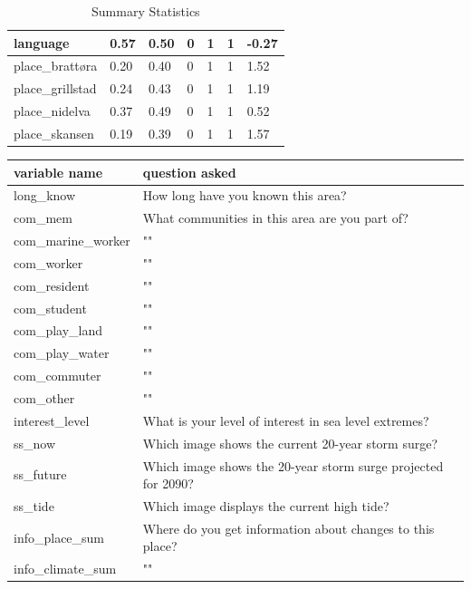 \begin{center}
\begin{table}[h]
\begin{tabular}{|l|l|l|l|l|l|l|}
        language & 0.57 & 0.50 & 0 & 1 & 1 & -0.27  \\ \hline
        place\_brattøra & 0.20 & 0.40 & 0 & 1 & 1 & 1.52  \\ \hline
        place\_grillstad & 0.24 & 0.43 & 0 & 1 & 1 & 1.19 \\ \hline
        place\_nidelva & 0.37 & 0.49 & 0 & 1 & 1 & 0.52 \\ \hline
        place\_skansen & 0.19 & 0.39 & 0 & 1 & 1 & 1.57 \\ \hline
    \end{tabular}
    \caption{Summary Statistics}
\label{table:summary_stats}
\end{table}
\end{center}


\begin{center}
\begin{table}[h]
    \centering
    \begin{tabular}{|l|l|}
    \hline
        variable name  & question asked \\ \hline
        long\_know & How long have you known this area? \\ \hline
        com\_mem  & What communities in this area are you part of? \\ \hline
        com\_marine\_worker & "" \\ \hline
        com\_worker & "" \\ \hline
        com\_resident & "" \\ \hline
        com\_student & "" \\ \hline
        com\_play\_land & "" \\ \hline
        com\_play\_water &  "" \\ \hline
        com\_commuter &  "" \\ \hline
        com\_other &  "" \\ \hline
        interest\_level & What is your level of interest in sea level extremes? \\ \hline
        ss\_now  & Which image shows the current 20-year storm surge? \\ \hline
        ss\_future  & Which image shows the 20-year storm surge projected for 2090? \\ \hline
        ss\_tide  & Which image displays the current high tide? \\ \hline
        info\_place\_sum & Where do you get information about changes to this place? \\ \hline
        info\_climate\_sum &  "" \\ \hline

\end{tabular}
\end{table}
\end{center}
